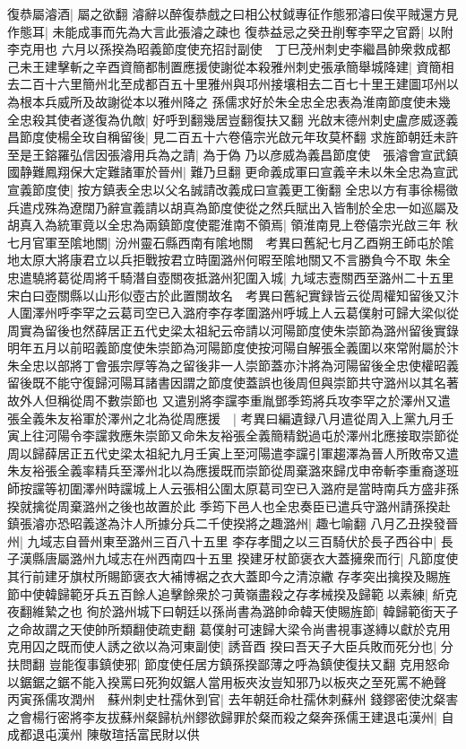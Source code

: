 復恭屬濬酒|{
	屬之欲翻}
濬辭以醉復恭戲之曰相公杖鉞專征作態邪濬曰俟平賊還方見作態耳|{
	未能成事而先為大言此張濬之疎也}
復恭益忌之癸丑削奪李罕之官爵|{
	以附李克用也}
六月以孫揆為昭義節度使充招討副使　丁巳茂州刺史李繼昌帥衆救成都己未王建擊斬之辛酉資簡都制置應援使謝從本殺雅州刺史張承簡舉城降建|{
	資簡相去二百十六里簡州北至成都百五十里雅州與邛州接壤相去二百七十里王建圖邛州以為根本兵威所及故謝從本以雅州降之}
孫儒求好於朱全忠全忠表為淮南節度使未幾全忠殺其使者遂復為仇敵|{
	好呼到翻幾居豈翻復扶又翻}
光啟末德州刺史盧彦威逐義昌節度使楊全玫自稱留後|{
	見二百五十六卷僖宗光啟元年玫莫杯翻}
求旌節朝廷未許至是王鎔羅弘信因張濬用兵為之請|{
	為于偽}
乃以彦威為義昌節度使　張濬會宣武鎮國静難鳳翔保大定難諸軍於晉州|{
	難乃旦翻}
更命義成軍曰宣義辛未以朱全忠為宣武宣義節度使|{
	按方鎮表全忠以父名誠請改義成曰宣義更工衡翻}
全忠以方有事徐楊徵兵遣戍殊為遼闊乃辭宣義請以胡真為節度使從之然兵賦出入皆制於全忠一如巡屬及胡真入為統軍竟以全忠為兩鎮節度使罷淮南不領焉|{
	領淮南見上卷僖宗光啟三年}
秋七月官軍至隂地關|{
	汾州靈石縣西南有隂地關　考異曰舊紀七月乙酉朔王師屯於隂地太原大將康君立以兵拒戰按君立時圍潞州何暇至隂地關又不言勝負今不取}
朱全忠遣驍將葛從周將千騎潛自壺關夜抵潞州犯圍入城|{
	九域志壼關西至潞州二十五里宋白曰壺關縣以山形似壺古於此置關故名　考異曰舊紀實録皆云從周權知留後又汴人圍澤州呼李罕之云葛司空已入潞府李存孝圍潞州呼城上人云葛僕射可歸大梁似從周實為留後也然薛居正五代史梁太祖紀云帝請以河陽節度使朱崇節為潞州留後實錄明年五月以前昭義節度使朱崇節為河陽節度使按河陽自解張全義圍以來常附屬於汴朱全忠以部將丁會張宗厚等為之留後非一人崇節蓋亦汴將為河陽留後全忠使權昭義留後既不能守復歸河陽耳諸書因謂之節度使蓋誤也後周但與崇節共守潞州以其名著故外人但稱從周不數崇節也}
又遣别將李讜李重胤鄧季筠將兵攻李罕之於澤州又遣張全義朱友裕軍於澤州之北為從周應援　|{
	考異曰編遺録八月遣從周入上黨九月壬寅上往河陽令李讜救應朱崇節又命朱友裕張全義簡精鋭過屯於澤州北應接取崇節從周以歸薛居正五代史梁太祖紀九月壬寅上至河陽遣李讜引軍趨澤為晉人所敗帝又遣朱友裕張全義率精兵至澤州北以為應援既而崇節從周棄潞來歸戊申帝斬李重裔遂班師按讜等初圍澤州時讜城上人云張相公圍太原葛司空已入潞府是當時南兵方盛非孫揆就擒從周棄潞州之後也故置於此}
季筠下邑人也全忠奏臣已遣兵守潞州請孫揆赴鎮張濬亦恐昭義遂為汴人所據分兵二千使揆將之趣潞州|{
	趣七喻翻}
八月乙丑揆發晉州|{
	九域志自晉州東至潞州三百八十五里}
李存孝聞之以三百騎伏於長子西谷中|{
	長子漢縣唐屬潞州九域志在州西南四十五里}
揆建牙杖節褒衣大蓋擁衆而行|{
	凡節度使其行前建牙旗杖所賜節褒衣大補博裾之衣大蓋即今之清涼繖}
存孝突出擒揆及賜旌節中使韓歸範牙兵五百餘人追擊餘衆於刁黄嶺盡殺之存孝械揆及歸範以素練|{
	紤克夜翻維縶之也}
徇於潞州城下曰朝廷以孫尚書為潞帥命韓天使賜旌節|{
	韓歸範銜天子之命故謂之天使帥所類翻使疏吏翻}
葛僕射可速歸大梁令尚書視事遂縳以獻於克用克用囚之既而使人誘之欲以為河東副使|{
	誘音酉}
揆曰吾天子大臣兵敗而死分也|{
	分扶問翻}
豈能復事鎮使邪|{
	節度使任居方鎮孫揆鄙薄之呼為鎮使復扶又翻}
克用怒命以鋸鋸之鋸不能入揆罵曰死狗奴鋸人當用板夾汝豈知邪乃以板夾之至死罵不絶聲　丙寅孫儒攻潤州　蘇州刺史杜孺休到官|{
	去年朝廷命杜孺休刺蘇州}
錢鏐密使沈粲害之會楊行密將李友拔蘇州粲歸杭州鏐欲歸罪於粲而殺之粲奔孫儒王建退屯漢州|{
	自成都退屯漢州}
陳敬瑄括富民財以供

